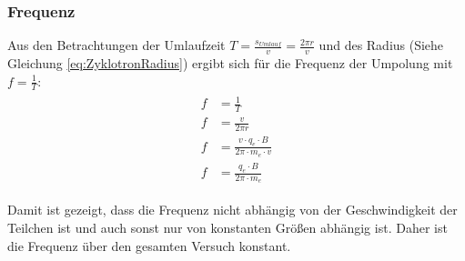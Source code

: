 \subsubsection{Frequenz}

Aus den Betrachtungen der Umlaufzeit $T = \frac{s_{Umlauf}}{v} = \frac{2 \pi r}{v}$ und des Radius (Siehe Gleichung \ref{eq:ZyklotronRadius}) ergibt sich für die Frequenz der Umpolung mit $f=\frac{1}{T}$: \\

\begin{align}
\begin{split}
	f &= \frac{1}{T} \\
	f &= \frac{v}{2 \pi r} \\
	f &= \frac{v \cdot q_e \cdot B}{2 \pi \cdot m_e \cdot v} \\
	f &= \frac{q_e \cdot B}{2 \pi \cdot m_e}
\end{split}
\end{align}

\noindent Damit ist gezeigt, dass die Frequenz nicht abhängig von der Geschwindigkeit der Teilchen ist und auch sonst nur von konstanten Größen abhängig ist. Daher ist die Frequenz über den gesamten Versuch konstant.




